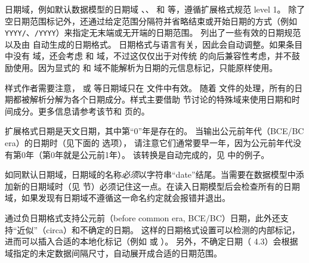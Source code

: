 日期域，例如默认数据模型的日期域 、、 和 等，遵循扩展格式规范 level 1。
除了  空日期范围标记外，还通过给定范围分隔符并省略结束或开始日期的方式（例如 \texttt{YYYY/}、\texttt{/YYYY}）来指定无末端或无开端的日期范围。
 列出了一些有效的日期规范以及由 \biblatex 自动生成的日期格式。
日期格式与语言有关，因此会自动调整。如果条目中没有  域，\biblatex 还会考虑  和  域，不过这仅仅出于对传统 \BibTeX 的向后兼容性考虑，并不鼓励使用。因为显式的  和  域不能解析为日期的元信息标记，只能原样使用。

样式作者需要注意， 或   等日期域只在  文件中有效。
随着  文件的处理，所有的日期都被解析分解为各个日期成分。样式主要借助 节讨论的特殊域来使用日期和时间成分。更多信息请参考该节和 \pageref{aut:bbx:fld:tab1} 页的。

 扩展格式日期是天文日期，其中第“0”年是存在的。
当输出公元前年代（BCE/BC era）的日期时（见下面的  选项），
请注意它们通常要早一年，因为公元前年代没有第0年（第0年就是公元前1年）。
该转换是自动完成的，见 中的例子。

如同默认日期域，日期域的名称\emph{必须}以字符串“date”结尾。当需要在数据模型中添加新的日期域时（见  节）必须记住这一点。\biblatex 在读入日期模型后会检查所有的日期域，如果发现有日期域不遵循这一命名约定就会报错并退出。

 通过负日期格式支持公元前（before common era, BCE/BC）日期，此外还支持“近似”（circa）和不确定的日期。
这样的日期格式设置可以检测的内部标记，进而可以插入合适的本地化标记（例如  或 ）。
另外，不确定日期（ 4.3）会根据 域指定的未定数据间隔尺寸，自动展开成合适的日期范围。

